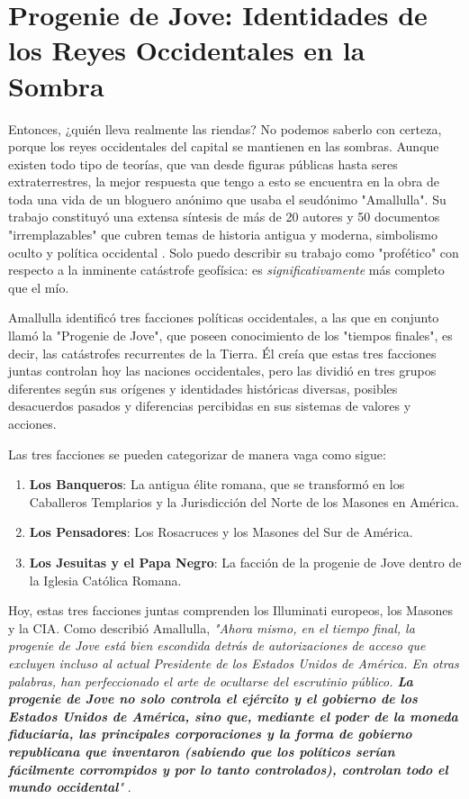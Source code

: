 \documentclass[10pt,twocolumn,letterpaper]{article}
\begin{document}
\section{Progenie de Jove: Identidades de los Reyes Occidentales en la Sombra}

Entonces, ¿quién lleva realmente las riendas? No podemos saberlo con certeza, porque los reyes occidentales del capital se mantienen en las sombras. Aunque existen todo tipo de teorías, que van desde figuras públicas hasta seres extraterrestres, la mejor respuesta que tengo a esto se encuentra en la obra de toda una vida de un bloguero anónimo que usaba el seudónimo "Amallulla". Su trabajo constituyó una extensa síntesis de más de 20 autores y 50 documentos "irremplazables" que cubren temas de historia antigua y moderna, simbolismo oculto y política occidental \cite{33,34}. Solo puedo describir su trabajo como "profético" con respecto a la inminente catástrofe geofísica: es \textit{significativamente} más completo que el mío.

Amallulla identificó tres facciones políticas occidentales, a las que en conjunto llamó la "Progenie de Jove", que poseen conocimiento de los "tiempos finales", es decir, las catástrofes recurrentes de la Tierra. Él creía que estas tres facciones juntas controlan hoy las naciones occidentales, pero las dividió en tres grupos diferentes según sus orígenes y identidades históricas diversas, posibles desacuerdos pasados y diferencias percibidas en sus sistemas de valores y acciones.

Las tres facciones se pueden categorizar de manera vaga como sigue:

\begin{flushleft}
\begin{enumerate}
    \item \textbf{Los Banqueros}: La antigua élite romana, que se transformó en los Caballeros Templarios y la Jurisdicción del Norte de los Masones en América.
    \item \textbf{Los Pensadores}: Los Rosacruces y los Masones del Sur de América.
    \item \textbf{Los Jesuitas y el Papa Negro}: La facción de la progenie de Jove dentro de la Iglesia Católica Romana.
\end{enumerate}
\end{flushleft}

Hoy, estas tres facciones juntas comprenden los Illuminati europeos, los Masones y la CIA. Como describió Amallulla, \textit{"Ahora mismo, en el tiempo final, la progenie de Jove está bien escondida detrás de autorizaciones de acceso que excluyen incluso al actual Presidente de los Estados Unidos de América. En otras palabras, han perfeccionado el arte de ocultarse del escrutinio público. \textbf{La progenie de Jove no solo controla el ejército y el gobierno de los Estados Unidos de América, sino que, mediante el poder de la moneda fiduciaria, las principales corporaciones y la forma de gobierno republicana que inventaron (sabiendo que los políticos serían fácilmente corrompidos y por lo tanto controlados), controlan todo el mundo occidental}"} \cite{33,34}.
\end{document}
